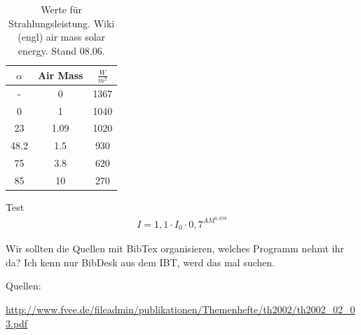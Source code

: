 \documentclass[fontsize=10pt,paper=a4,bibliography=totoc]{scrartcl}
\begin{document}
\begin{table}
\centering
	\caption{Werte für Strahlungsleistung. Wiki (engl) air mass solar energy. Stand 08.06.}
	\label{tab:airmass}
\begin{tabular}{|c|c|c|}
	\hline
	$\alpha$ & Air Mass & $\frac{W}{m^2}$\\
	\hline
	- & 0 & 1367\\
	\hline
	0 & 1 & 1040\\
	\hline
	23 & 1.09 & 1020\\
	\hline
	48.2 & 1.5 & 930\\
	\hline
	75 & 3.8 & 620\\
	\hline
	85 & 10 & 270\\
	\hline
\end{tabular}
\end{table}
Test
\begin{align*}
	I=1,1\cdot I_0 \cdot 0,7^{AM^{0,678}}
	\label{eqn:Intensity}
\end{align*}

Wir sollten die Quellen mit BibTex organisieren, welches Programm nehmt ihr da? Ich kenn nur BibDesk aus dem IBT, werd das mal suchen.

Quellen:

\url{http://www.fvee.de/fileadmin/publikationen/Themenhefte/th2002/th2002_02_03.pdf}
\end{document}
